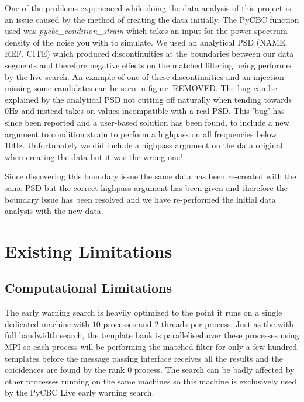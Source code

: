 One of the problems experienced while doing the data analysis of this project is an issue caused by the method of creating the data initially. The PyCBC function used was \emph{pycbc\_condition\_strain} which takes an input for the power spectrum density of the noise you with to simulate. We used an analytical PSD (NAME, REF, CITE) which produced discontinuities at the boundaries between our data segments and therefore negative effects on the matched filtering being performed by the live search. An example of one of these discontinuities and an injection missing some candidates can be seen in figure~REMOVED.
The bug can be explained by the analytical PSD not cutting off naturally when tending towards 0Hz and instead takes on values incompatible with a real PSD. This 'bug' has since been reported and a user-based solution has been found, to include a new argument to condition strain to perform a highpass on all frequencies below 10Hz. Unfortunately we did include a highpass argument on the data originall when creating the data but it was the wrong one!

Since discovering this boundary issue the same data has been re-created with the same PSD but the correct highpass argument has been given and therefore the boundary issue has been resolved and we have re-performed the initial data analysis with the new data.


\section{Existing Limitations}

\subsection{Computational Limitations}

The early warning search is heavily optimized to the point it runs on a single dedicated machine with $10$ processes and $2$ threads per process. Just as the with full bandwidth search, the template bank is parallelised over these processes using MPI so each process will be performing the matched filter for only a few hundred templates before the message passing interface receives all the results and the coicidences are found by the rank 0 process. The search can be badly affected by other processes running on the same machines so this machine is exclusively used by the PyCBC Live early warning search.

